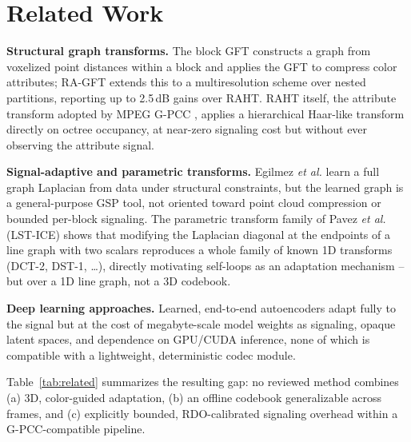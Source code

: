 \documentclass[conference]{IEEEtran}
\begin{document}
\section{Related Work}
\textbf{Structural graph transforms.} The block GFT \cite{zhang2014point} constructs a graph
from voxelized point distances within a block and applies the GFT to compress color attributes;
RA-GFT \cite{pavez2020region} extends this to a multiresolution scheme over nested partitions,
reporting up to 2.5\,dB gains over RAHT. RAHT \cite{dequeiroz2016raht} itself, the attribute
transform adopted by MPEG G-PCC \cite{graziosi2020overview}, applies a hierarchical Haar-like
transform directly on octree occupancy, at near-zero signaling cost but without ever observing
the attribute signal.

\textbf{Signal-adaptive and parametric transforms.} Egilmez \emph{et al.}
\cite{egilmez2017graphlearning} learn a full graph Laplacian from data under structural
constraints, but the learned graph is a general-purpose GSP tool, not oriented toward point
cloud compression or bounded per-block signaling. The parametric transform family of
Pavez \emph{et al.} (LST-ICE) shows that modifying the Laplacian diagonal at the endpoints of a
line graph with two scalars reproduces a whole family of known 1D transforms (DCT-2, DST-1,
\dots), directly motivating self-loops as an adaptation mechanism -- but over a 1D line graph,
not a 3D codebook.

\textbf{Deep learning approaches.} Learned, end-to-end autoencoders
\cite{quach2019learning,sheng2021deeppcac,fang2022_3dac} adapt fully to the signal but at the
cost of megabyte-scale model weights as signaling, opaque latent spaces, and dependence on
GPU/CUDA inference, none of which is compatible with a lightweight, deterministic codec module.

Table~\ref{tab:related} summarizes the resulting gap: no reviewed method combines (a) 3D,
color-guided adaptation, (b) an offline codebook generalizable across frames, and
(c) explicitly bounded, RDO-calibrated signaling overhead within a G-PCC-compatible pipeline.
\end{document}
